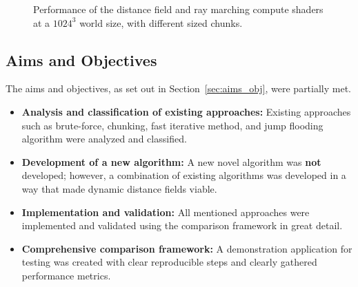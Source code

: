 \begin{figure}
    \caption{Performance of the distance field and ray marching compute shaders at a $1024^3$ world size, with
        different sized chunks.}
    \label{fig:final_df_perf}
\end{figure}

\subsection{Aims and Objectives}
The aims and objectives, as set out in Section~\ref{sec:aims_obj}, were partially met.

\begin{itemize}
    \item \textbf{Analysis and classification of existing approaches:} Existing approaches such as brute-force, chunking,
          fast iterative method, and jump flooding algorithm were analyzed and classified.
    \item \textbf{Development of a new algorithm:} A new novel algorithm was \textbf{not} developed; however, a
          combination of existing algorithms was developed in a way that made dynamic distance fields viable.
    \item \textbf{Implementation and validation:} All mentioned approaches were implemented and validated using the
          comparison framework in great detail.
    \item \textbf{Comprehensive comparison framework:} A demonstration application for testing was created with clear
          reproducible steps and clearly gathered performance metrics.
\end{itemize}

